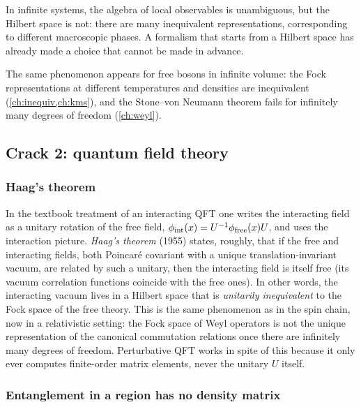 \begin{keyidea}
In infinite systems, the algebra of local observables is unambiguous, but the Hilbert space is not: there are many inequivalent representations, corresponding to different macroscopic phases. A formalism that starts from a Hilbert space has already made a choice that cannot be made in advance.
\end{keyidea}

The same phenomenon appears for free bosons in infinite volume: the Fock representations at different temperatures and densities are inequivalent (\cref{ch:inequiv,ch:kms}), and the Stone--von Neumann theorem fails for infinitely many degrees of freedom (\cref{ch:weyl}).

\subsection{Crack 2: quantum field theory}

\subsubsection{Haag's theorem}\label{sec:haagthm}

In the textbook treatment of an interacting QFT one writes the interacting field as a unitary rotation of the free field, $\phi_{\rm int}(x)=U^{-1}\phi_{\rm free}(x)U$, and uses the interaction picture. \emph{Haag's theorem} (1955) \cite{Haag1955} states, roughly, that if the free and interacting fields, both Poincar\'e covariant with a unique translation-invariant vacuum, are related by such a unitary, then the interacting field is itself free (its vacuum correlation functions coincide with the free ones). In other words, the interacting vacuum lives in a Hilbert space that is \emph{unitarily inequivalent} to the Fock space of the free theory. This is the same phenomenon as in the spin chain, now in a relativistic setting: the Fock space of Weyl operators is not the unique representation of the canonical commutation relations once there are infinitely many degrees of freedom. Perturbative QFT works in spite of this because it only ever computes finite-order matrix elements, never the unitary $U$ itself.

\subsubsection{Entanglement in a region has no density matrix}

